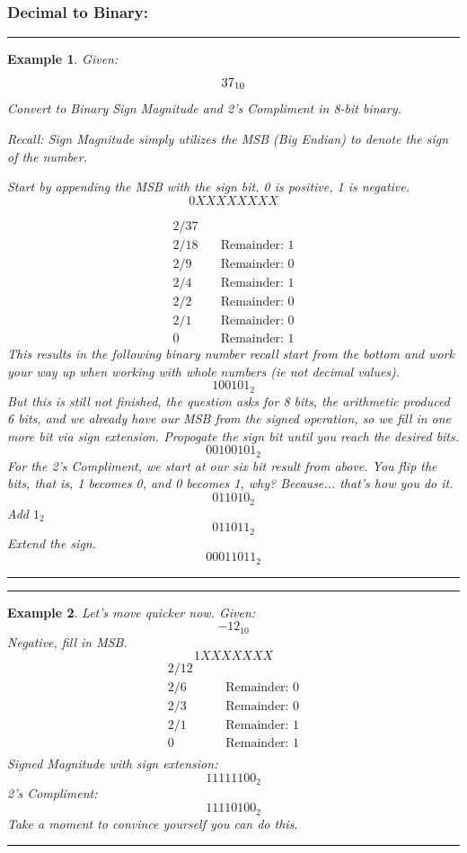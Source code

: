 \documentclass[12pt]{article}
\newtheorem{example}{Example}
\newenvironment{examp}
{
    \vspace{0.5cm}
    \hrule
    \begin{example}\upshape
}
{
    \end{example}
    \hrule
    \vspace{0.5cm}
}
\begin{document}
\subsubsection{Decimal to Binary:}
\begin{examp}
	Given:
	\[
		37_{10}\\
	\]
	Convert to Binary Sign Magnitude and 2's Compliment in 8-bit
	binary.

	\textit{Recall:} Sign Magnitude simply utilizes the MSB (Big Endian)
	to denote the sign of the number.

	Start by appending the MSB with the sign bit. 0 is positive, 1
	is negative.
	\[
		0XXXXXXXX
	\]

	\begin{align*}
		2  / 37 \quad &                     \\
		2  / 18 \quad & \text{Remainder: 1} \\
		2  / 9 \quad  & \text{Remainder: 0} \\
		2  / 4 \quad  & \text{Remainder: 1} \\
		2  / 2 \quad  & \text{Remainder: 0} \\
		2  / 1\quad   & \text{Remainder: 0} \\
		0\quad        & \text{Remainder: 1}
	\end{align*}
	This results in the following binary number recall start from the
	bottom and work your way up when working with whole numbers (ie
	not decimal values).
	\[
		100101_2
	\]
	But this is still not finished, the question asks for 8 bits,
	the arithmetic produced 6 bits, and we already have our MSB from
	the signed operation, so we fill in one more bit via
	\textit{sign extension}. Propogate the sign bit until you reach
	the desired bits.
	\[
		00100101_2
	\]
	For the 2's Compliment, we start at our six bit result from above.
	You flip the bits, that is, 1 becomes 0, and 0 becomes 1, why?
	Because... that's how you do it.
	\[
		011010_2
	\]
	Add $1_2$
	\[
		011011_2
	\]
	Extend the sign.
	\[
		00011011_2
	\]
\end{examp}

\begin{examp}
	Let's move quicker now. \newline
	Given:
	\[
		-12_{10}
	\]
	Negative, fill in MSB.
	\[
		1XXXXXXX
	\]
	\begin{align*}
		2 / 12 &                             \\
		2 / 6  & \quad & \text{Remainder: 0} \\
		2 / 3  & \quad & \text{Remainder: 0} \\
		2 / 1  & \quad & \text{Remainder: 1} \\
		0      & \quad & \text{Remainder: 1} \\
	\end{align*}
	Signed Magnitude with sign extension:
	\[
		11111100_2
	\]
	2's Compliment:
	\[
		11110100_2
	\]
	Take a moment to convince yourself you can do this.
\end{examp}
\end{document}
